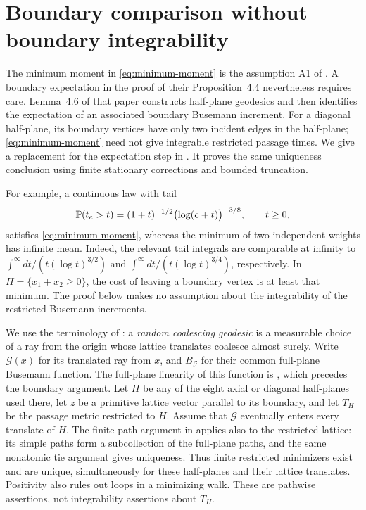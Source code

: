 \section{Boundary comparison without boundary integrability}
\label{sec:boundary-comparison}

The minimum moment in \eqref{eq:minimum-moment} is the assumption A1 of
\cite{AhlbergHoffman}. A boundary expectation in the proof of their
Proposition~4.4 nevertheless requires care. Lemma~4.6 of that paper
constructs half-plane geodesics and then identifies the expectation of
an associated boundary Busemann increment. For a diagonal half-plane,
its boundary vertices have only two incident edges in the half-plane;
\eqref{eq:minimum-moment} need not give integrable restricted passage
times. We give a replacement for the expectation step in
\cite[Section~4.5]{AhlbergHoffman}. It proves the same uniqueness
conclusion using finite stationary corrections and bounded truncation.

For example, a continuous law with tail
\[
 \mathbb P(t_e>t)=(1+t)^{-1/2}\bigl(\log(e+t)\bigr)^{-3/8},\qquad t\geq0,
\]
satisfies \eqref{eq:minimum-moment}, whereas the minimum of two
independent weights has infinite mean. Indeed, the relevant tail
integrals are comparable at infinity to
\(\int^\infty dt/(t(\log t)^{3/2})\) and
\(\int^\infty dt/(t(\log t)^{3/4})\), respectively. In
\(H=\{x_1+x_2\geq0\}\), the cost of leaving a boundary vertex is at
least that minimum. The proof below makes no assumption about the
integrability of the restricted Busemann increments.

We use the terminology of \cite[Definition~2.3]{AhlbergHoffman}:
a \emph{random coalescing geodesic} is a measurable choice of a ray
from the origin whose lattice translates coalesce almost surely.
Write \(\mathcal G(x)\) for its translated ray from \(x\), and
\(B_{\mathcal G}\) for their common full-plane Busemann function.
The full-plane linearity of this function is
\cite[Proposition~4.2]{AhlbergHoffman}, which precedes the boundary
argument. Let \(H\) be any of the eight axial or diagonal half-planes
used there, let \(z\) be a primitive lattice vector parallel to its
boundary, and let \(T_H\) be the passage metric restricted to \(H\).
Assume that \(\mathcal G\) eventually enters every translate of \(H\).
The finite-path argument in  applies also to
the restricted lattice: its simple paths form a subcollection of the
full-plane paths, and the same nonatomic tie argument gives uniqueness.
Thus finite restricted minimizers exist and are unique, simultaneously
for these half-planes and their lattice translates. Positivity also
rules out loops in a minimizing walk. These are pathwise assertions,
not integrability assertions about \(T_H\).

